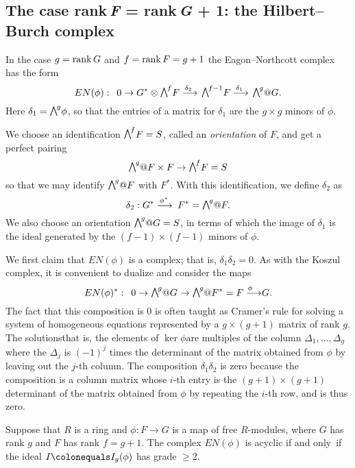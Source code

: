 
\subsection*{The case rank\,{\itshape F} = rank\,{\itshape G} + 1: the Hilbert--Burch complex}

In the case $g=\operatorname{rank} G$ and $f = \operatorname{rank} F = g+1$ the
Eagon--Northcott complex has the form
$$
EN(\phi):\quad 0\to G^{*}\otimes \mwedge^{f}F \ruto {\delta_{2}}
\mwedge^{f-1}F \ruto {\delta_{1}} \mwedge^g@G.
$$
Here $\delta_{1} = \mwedge^{g}\phi$, so that the entries of a matrix for
$\delta_{1}$ are the $g\times g$ minors of
$\phi$.

We choose an identification $\mwedge^{f}F = S$, called an
%
\emph{orientation}
of $F$, and get a perfect pairing
$$
\mwedge^{g}@F \times F \to \mwedge^{f}F = S
$$
so that we may identify
$\mwedge^{g}@F$ with $F^{*}$. With this identification, we define
$\delta_{2}$ as
$$
\delta_{2}:  G^{*}\ruto {\phi^{*}}  F^{*} = \mwedge^{g}@F.
$$
We also choose an orientation $\mwedge^{g}@G = S$, in terms of which the
image of $\delta_{1}$ is
the ideal generated by the $(f{-}1)\times (f{-}1)$  minors of $\phi$.

We first claim that $EN(\phi)$ is a complex; that is,
$\delta_{1}\delta_{2} = 0$.  As with the Koszul complex,
%
it is convenient to dualize and consider the maps
$$
EN(\phi)^{*}:\quad 0\to \mwedge^{g} @
G \to \mwedge^{g}@F^{*} = F\ruto{\,\phi} G
.
$$
The fact that this composition is 0 is often taught as 
Cramer's rule
%
for solving a system of
homogeneous equations represented by a $g\times (g+1)$ matrix of rank $g$.
The solutions\emdash that is, the elements of $\ker \phi$\emdash are
multiples of the column
$\Delta_{1}, \dots, \Delta_{g}$ where the $\Delta_{j}$ is 
$(-1)^{j}$
times the determinant
of the matrix obtained from $\phi$ by leaving out the $j$-th column. 
The composition $\delta_{1}\delta_{2}$ is zero
because the composition  is a column matrix whose $i$-th
entry is the
$(g+1)\times (g+1)$ determinant of the matrix obtained
from $\phi$ by
repeating the $i$-th row, and is thus zero.

\begin{theorem}\label{EN grade 2}
Suppose that $R$ is a ring and $\phi: F\to G$ is a map of  free
$R$-modules,
where $G$ has rank $g$ and $F$ has rank $f = g+1$.
The complex $EN(\phi)$ is acyclic if and only~if the ideal $I
\colonequals  I_{g}(\phi)$ has grade $\geq 2$.
\unif
\end{theorem}

